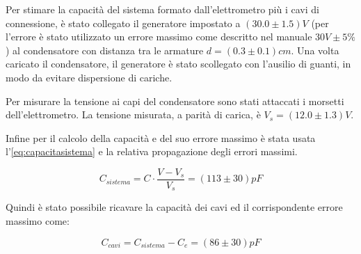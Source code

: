 {\fontsize{11}{14}\selectfont 

Per stimare la capacità del sistema formato dall'elettrometro più i cavi di connessione, è stato collegato il generatore impostato a $(30.0 \pm 1.5) V$ (per l'errore è stato utilizzato un errore massimo come descritto nel manuale $30V \pm 5\%$) al condensatore con distanza tra le armature $d = (0.3 \pm 0.1) cm$. Una volta caricato il condensatore, il generatore è stato scollegato con l'ausilio di guanti, in modo da evitare dispersione di cariche. 
\par
Per misurare la tensione ai capi del condensatore sono stati attaccati i morsetti dell'elettrometro. La tensione misurata, a parità di carica, è $V_s = (12.0 \pm 1.3) V$.
\par
Infine per il calcolo della capacità e del suo errore massimo è stata usata l'\autoref{eq:capacitasistema} e la relativa propagazione degli errori massimi.

\begin{equation} \label{eq:capacitasistema}
    C_{sistema} = C \cdot \dfrac{V - V_s}{V_s} = (113 \pm 30) pF
\end{equation}


\par
Quindi è stato possibile ricavare la capacità dei cavi ed il corrispondente errore massimo come:

\begin{equation}
    C_{cavi} = C_{sistema} - C_e = (86 \pm 30) pF
\end{equation}
\par}